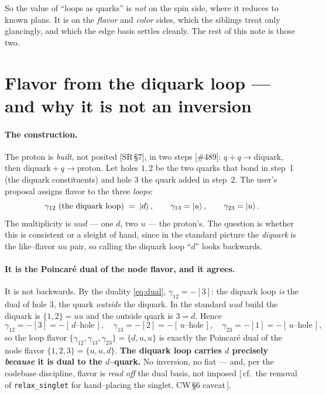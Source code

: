 \documentclass[11pt,oneside]{article}
\newcommand{\code}[1]{\texttt{#1}}
\theoremstyle{plain}
\begin{document}
So the value of ``loops as quarks'' is \emph{not} on the spin side, where it
reduces to known plans. It is on the \emph{flavor} and \emph{color} sides, which
the siblings treat only glancingly, and which the edge basis settles cleanly. The
rest of this note is those two.

\section{Flavor from the diquark loop --- and why it is not an inversion}
\label{sec:flavor}

\paragraph{The construction.}
The proton is \emph{built}, not posited [SR\,\S7], in two steps [\#489]:
$q+q\to\text{diquark}$, then $\text{diquark}+q\to\text{proton}$. Let holes $1,2$
be the two quarks that bond in step~1 (the diquark constituents) and hole $3$ the
quark added in step~2. The user's proposal assigns flavor to the three
\emph{loops}:
\begin{equation}
  \gamma_{12}\ (\text{the diquark loop})\;=\;\ket d,\qquad
  \gamma_{13}=\ket u,\qquad \gamma_{23}=\ket u .
  \label{eq:loopflavor}
\end{equation}
The multiplicity is $uud$ --- one $d$, two $u$ --- the proton's. The question is
whether this is consistent or a sleight of hand, since in the standard picture the
\emph{diquark} is the like--flavor $uu$ pair, so calling the diquark loop ``$d$''
looks backwards.

\paragraph{It is the Poincar\'e dual of the node flavor, and it agrees.}
It is not backwards. By the duality \eqref{eq:dual}, $\gamma_{12}=-[3]$: the
diquark loop \emph{is} the dual of hole $3$, the quark \emph{outside} the diquark.
In the standard $uud$ build the diquark is $\{1,2\}=uu$ and the outside quark is
$3=d$. Hence
\begin{equation}
  \gamma_{12}=-[3]=-[\,d\text{--hole}\,],\quad
  \gamma_{13}=-[2]=-[\,u\text{--hole}\,],\quad
  \gamma_{23}=-[1]=-[\,u\text{--hole}\,],
\end{equation}
so the loop flavor $\{\gamma_{12},\gamma_{13},\gamma_{23}\}=\{d,u,u\}$ is exactly
the Poincar\'e dual of the node flavor $\{1,2,3\}=\{u,u,d\}$. \textbf{The diquark
loop carries $d$ precisely \emph{because} it is dual to the $d$--quark.} No
inversion, no fiat --- and, per the codebase discipline, flavor is \emph{read off}
the dual basis, not imposed [\,cf.\ the removal of \code{relax\_singlet} for
hand--placing the singlet, CW\,\S6 caveat\,].
\end{document}
